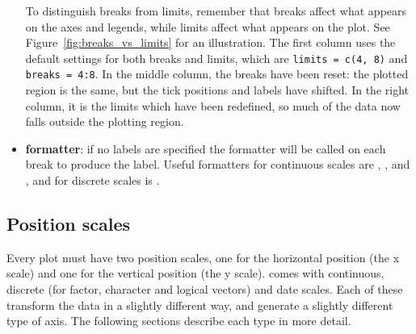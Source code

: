 \begin{itemize}
  To distinguish breaks from limits, remember that breaks affect what appears on the axes and legends, while limits affect what appears on the plot.  See Figure~\ref{fig:breaks_vs_limits} for an illustration.  The first column uses the default settings for both breaks and limits, which are {\tt limits = c(4, 8)} and {\tt breaks = 4:8}.  In the middle column, the breaks have been reset: the plotted region is the same, but the tick positions and labels have shifted.  In the right column, it is the limits which have been redefined, so much of the data now falls outside the plotting region. 
  
    

  \item {\bf formatter}: if no labels are specified the formatter will be called on each break to produce the label.  Useful formatters for continuous scales are , ,  and , and for discrete scales is . 
\end{itemize}

\subsection{Position scales}
\label{sub:scale-position}

Every plot must have two position scales, one for the horizontal position (the x scale) and one for the vertical position (the y scale). \ggplot comes with continuous, discrete (for factor, character and logical vectors) and date scales. Each of these transform the data in a slightly different way, and generate a slightly different type of axis. The following sections describe each type in more detail.  

